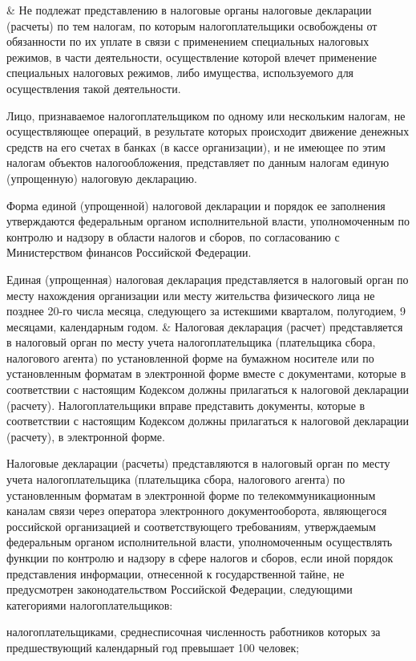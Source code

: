 \documentclass[a4page]{report}
\begin{document}
& Не подлежат представлению в налоговые органы налоговые декларации (расчеты) по тем налогам, по которым налогоплательщики освобождены от обязанности по их уплате в связи с применением специальных налоговых режимов, в части деятельности, осуществление которой влечет применение специальных налоговых режимов, либо имущества, используемого для осуществления такой деятельности.
\par Лицо, признаваемое налогоплательщиком по одному или нескольким налогам, не осуществляющее операций, в результате которых происходит движение денежных средств на его счетах в банках (в кассе организации), и не имеющее по этим налогам объектов налогообложения, представляет по данным налогам единую (упрощенную) налоговую декларацию.
\par Форма единой (упрощенной) налоговой декларации и порядок ее заполнения утверждаются федеральным органом исполнительной власти, уполномоченным по контролю и надзору в области налогов и сборов, по согласованию с Министерством финансов Российской Федерации.
\par Единая (упрощенная) налоговая декларация представляется в налоговый орган по месту нахождения организации или месту жительства физического лица не позднее 20-го числа месяца, следующего за истекшими кварталом, полугодием, 9 месяцами, календарным годом.
& Налоговая декларация (расчет) представляется в налоговый орган по месту учета налогоплательщика (плательщика сбора, налогового агента) по установленной форме на бумажном носителе или по установленным форматам в электронной форме вместе с документами, которые в соответствии с настоящим Кодексом должны прилагаться к налоговой декларации (расчету). Налогоплательщики вправе представить документы, которые в соответствии с настоящим Кодексом должны прилагаться к налоговой декларации (расчету), в электронной форме.
\par Налоговые декларации (расчеты) представляются в налоговый орган по месту учета налогоплательщика (плательщика сбора, налогового агента) по установленным форматам в электронной форме по телекоммуникационным каналам связи через оператора электронного документооборота, являющегося российской организацией и соответствующего требованиям, утверждаемым федеральным органом исполнительной власти, уполномоченным осуществлять функции по контролю и надзору в сфере налогов и сборов, если иной порядок представления информации, отнесенной к государственной тайне, не предусмотрен законодательством Российской Федерации, следующими категориями налогоплательщиков:
\par налогоплательщиками, среднесписочная численность работников которых за предшествующий календарный год превышает 100 человек;
\end{document}
